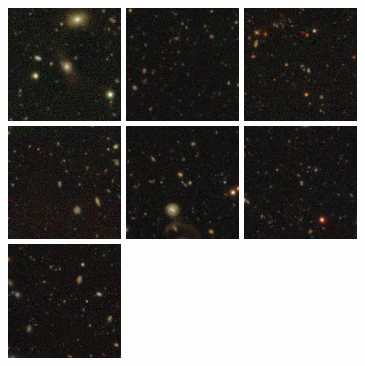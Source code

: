 \begin{figure}
\begin{center}
\includegraphics[angle=0,width=3.0cm]{figures/thumbnails/SN2006fk.png}
\includegraphics[angle=0,width=3.0cm]{figures/thumbnails/SN2006gn.png}
\includegraphics[angle=0,width=3.0cm]{figures/thumbnails/SN2006hf.png}
\includegraphics[angle=0,width=3.0cm]{figures/thumbnails/SN2006hk.png}
\includegraphics[angle=0,width=3.0cm]{figures/thumbnails/SN2006mn.png}
\includegraphics[angle=0,width=3.0cm]{figures/thumbnails/SN2006nj.png}
\includegraphics[angle=0,width=3.0cm]{figures/thumbnails/SN2006nu.png}

\end{center}
\end{figure}

